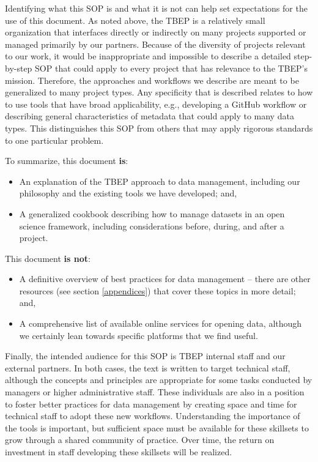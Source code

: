 \documentclass[
]{book}
\providecommand{\tightlist}{%
  \setlength{\itemsep}{0pt}\setlength{\parskip}{0pt}}
\begin{document}
Identifying what this SOP is and what it is not can help set expectations for the use of this document. As noted above, the TBEP is a relatively small organization that interfaces directly or indirectly on many projects supported or managed primarily by our partners. Because of the diversity of projects relevant to our work, it would be inappropriate and impossible to describe a detailed step-by-step SOP that could apply to every project that has relevance to the TBEP's mission. Therefore, the approaches and workflows we describe are meant to be generalized to many project types. Any specificity that is described relates to how to use tools that have broad applicability, e.g., developing a GitHub workflow or describing general characteristics of metadata that could apply to many data types. This distinguishes this SOP from others that may apply rigorous standards to one particular problem.

To summarize, this document \textbf{is}:

\begin{itemize}
\tightlist
\item
  An explanation of the TBEP approach to data management, including our philosophy and the existing tools we have developed; and,
\item
  A generalized cookbook describing how to manage datasets in an open science framework, including considerations before, during, and after a project.
\end{itemize}

This document \textbf{is not}:

\begin{itemize}
\tightlist
\item
  A definitive overview of best practices for data management -- there are other resources (see section \ref{appendices}) that cover these topics in more detail; and,
\item
  A comprehensive list of available online services for opening data, although we certainly lean towards specific platforms that we find useful.
\end{itemize}

Finally, the intended audience for this SOP is TBEP internal staff and our external partners. In both cases, the text is written to target technical staff, although the concepts and principles are appropriate for some tasks conducted by managers or higher administrative staff. These individuals are also in a position to foster better practices for data management by creating space and time for technical staff to adopt these new workflows. Understanding the importance of the tools is important, but sufficient space must be available for these skillsets to grow through a shared community of practice. Over time, the return on investment in staff developing these skillsets will be realized.
\end{document}
